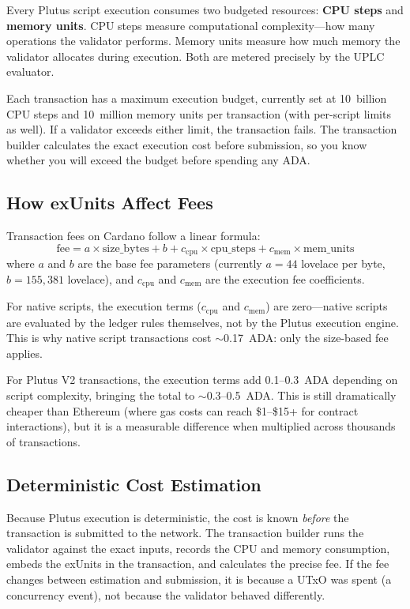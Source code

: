 Every Plutus script execution consumes two budgeted resources:
\textbf{CPU steps} and \textbf{memory units}. CPU steps measure
computational complexity---how many operations the validator performs.
Memory units measure how much memory the validator allocates during
execution. Both are metered precisely by the UPLC evaluator.

Each transaction has a maximum execution budget, currently set at
10~billion CPU steps and 10~million memory units per transaction (with
per-script limits as well). If a validator exceeds either limit, the
transaction fails. The transaction builder calculates the exact
execution cost before submission, so you know whether you will exceed
the budget before spending any ADA.

\subsection{How exUnits Affect Fees}

Transaction fees on Cardano follow a linear formula:
\[
  \mathrm{fee} = a \times \mathrm{size\_bytes} + b + c_{\mathrm{cpu}} \times \mathrm{cpu\_steps} + c_{\mathrm{mem}} \times \mathrm{mem\_units}
\]
where $a$ and $b$ are the base fee parameters (currently $a = 44$
lovelace per byte, $b = 155{,}381$ lovelace), and $c_{\mathrm{cpu}}$
and $c_{\mathrm{mem}}$ are the execution fee coefficients.

For native scripts, the execution terms ($c_{\mathrm{cpu}}$ and
$c_{\mathrm{mem}}$) are zero---native scripts are evaluated by the
ledger rules themselves, not by the Plutus execution engine. This is
why native script transactions cost ${\sim}$0.17~ADA: only the
size-based fee applies.

For Plutus V2 transactions, the execution terms add 0.1--0.3~ADA
depending on script complexity, bringing the total to ${\sim}$0.3--0.5~ADA.
This is still dramatically cheaper than Ethereum (where gas costs can
reach \$1--\$15+ for contract interactions), but it is a measurable
difference when multiplied across thousands of transactions.

\subsection{Deterministic Cost Estimation}

Because Plutus execution is deterministic, the cost is known
\emph{before} the transaction is submitted to the network. The
transaction builder runs the validator against the exact inputs,
records the CPU and memory consumption, embeds the exUnits in the
transaction, and calculates the precise fee. If the fee changes between
estimation and submission, it is because a UTxO was spent (a
concurrency event), not because the validator behaved differently.

